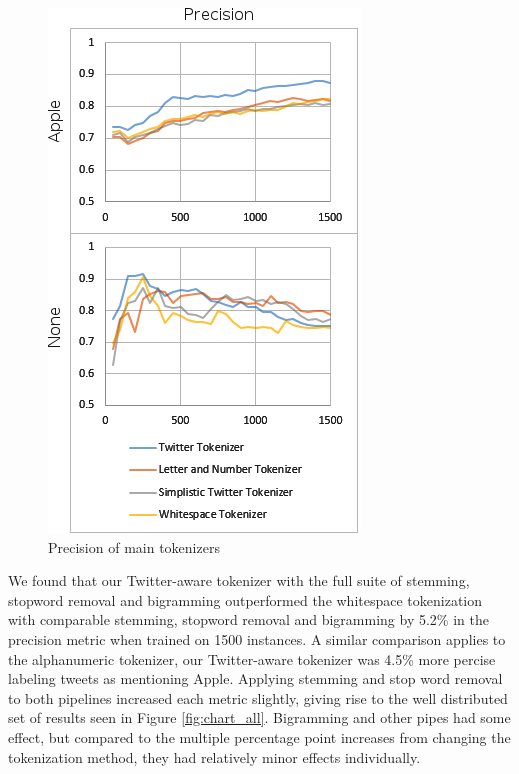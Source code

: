 \documentclass[letterpaper]{article}
\begin{document}
\begin{figure}[ht]
\centering
\includegraphics[]{img/tokenizers}
\caption{Precision of main tokenizers}
\label{fig:tokenizer_precision}
\end{figure}

We found that our Twitter-aware tokenizer with the full suite of stemming, stopword removal and bigramming outperformed the whitespace tokenization with comparable stemming, stopword removal and bigramming by 5.2\% in the precision metric when trained on 1500 instances. A similar comparison applies to the alphanumeric tokenizer, our Twitter-aware tokenizer was 4.5\% more percise labeling tweets as mentioning Apple. Applying stemming and stop word removal to both pipelines increased each metric slightly, giving rise to the well distributed set of results seen in Figure \ref{fig:chart_all}. Bigramming and other pipes had some effect, but compared to the multiple percentage point increases from changing the tokenization method, they had relatively minor effects individually.

\end{document}

